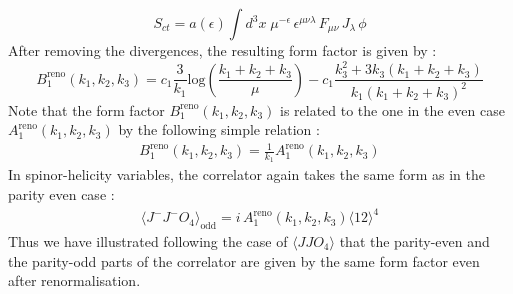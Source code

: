 \documentclass[a4paper,11pt]{article}
\begin{document}
\begin{equation}
\label{ctjjotype1}
S_{ct}=a(\epsilon)\int{d^{3}x\; \mu^{-\epsilon}\,\epsilon^{\mu\nu\lambda}\,F_{\mu\nu}\,J_{\lambda}\,\phi}
\end{equation}
 After removing the divergences, the resulting form factor is given by :
\begin{equation}\label{jjo4form}
B^{\text{reno}}_1(k_1, k_2, k_3)=c_1\frac{3}{k_1}\text{log}\left(\frac{k_1+k_2+k_3}{\mu}\right)-c_1\frac{k_3^2+3k_3(k_1+k_2+k_3)}{k_1(k_1+k_2+k_3)^2}
\end{equation}
%
Note that the form factor $B^{\text{reno}}_1(k_1,k_2,k_3)$ is related to the one in the even case $A^{\text{reno}}_1(k_1,k_2,k_3)$ by the following simple relation :
%
\begin{align}
B_1^{\text{reno}}(k_1, k_2, k_3)=\frac{1}{k_1}A_1^{\text{reno}}(k_1, k_2, k_3)
\end{align}
%
In spinor-helicity variables, the correlator again takes the same form as in the parity even case :
%
%
\begin{align}
\langle J^{-}J^{-}O_{4}\rangle_{\text{odd}}=i\,A^{\text{reno}}_1(k_1,k_2,k_3)\langle 12\rangle^4
\end{align}
%
Thus we have illustrated following the case of $\langle JJO_4\rangle$ that the parity-even and the parity-odd parts of the correlator are given by the same form factor even after renormalisation.
\end{document}
